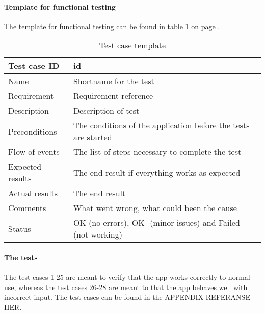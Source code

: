			\paragraph{Template for functional testing}		
			The template for functional testing can be found in table \ref{tab:casetemp1} on page \pageref{tab:casetemp1}.	
				\begin{table}
					\begin{tabular}{l|p{10cm}}\hline
						Test case ID & id \\ \hline
						Name & Shortname for the test\\ \hline
						Requirement & Requirement reference\\ \hline
						Description & Description of test\\ \hline
						Preconditions & The conditions of the application before the tests are started\\ \hline
						Flow of events & The list of steps necessary to complete the test \\ \hline
						Expected results & The end result if everything works as expected\\ \hline 
						Actual results & The end result\\ \hline
						Comments & What went wrong, what could been the cause\\ \hline
						Status &OK (no errors), OK- (minor issues) and Failed (not working)\\ \hline
					\end{tabular}
				\caption{Test case template} \label{tab:casetemp1}
			\end{table}
			\paragraph{The tests}
				The test cases 1-25 are meant to verify that the app works correctly to normal use, whereas the test cases 26-28 are meant to that the app behaves well with incorrect input. The test cases can be found in the APPENDIX REFERANSE HER.
